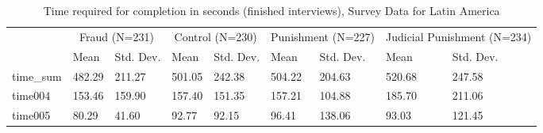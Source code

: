 \begin{table}

\caption{Time required for completion in seconds (finished interviews), Survey Data for Latin America}
\centering
\begin{tabular}[t]{lllllllll}
\toprule
\multicolumn{1}{c}{ } & \multicolumn{2}{c}{Fraud (N=231)} & \multicolumn{2}{c}{Control (N=230)} & \multicolumn{2}{c}{Punishment (N=227)} & \multicolumn{2}{c}{Judicial Punishment (N=234)} \\
\cmidrule(l{3pt}r{3pt}){2-3} \cmidrule(l{3pt}r{3pt}){4-5} \cmidrule(l{3pt}r{3pt}){6-7} \cmidrule(l{3pt}r{3pt}){8-9}
  & Mean & Std. Dev. & Mean  & Std. Dev.  & Mean   & Std. Dev.   & Mean    & Std. Dev.   \\
\midrule
time\_sum & 482.29 & 211.27 & 501.05 & 242.38 & 504.22 & 204.63 & 520.68 & 247.58\\
time004 & 153.46 & 159.90 & 157.40 & 151.35 & 157.21 & 104.88 & 185.70 & 211.06\\
time005 & 80.29 & 41.60 & 92.77 & 92.15 & 96.41 & 138.06 & 93.03 & 121.45\\
\bottomrule
\end{tabular}
\end{table}
